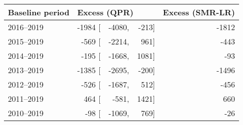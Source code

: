 \begin{tabular}{lrrrr} 
\hline
Baseline period & \multicolumn{3}{l}{Excess (QPR)} & Excess (SMR-LR) \\ 
\hline
2016--2019    &    -1984 [ & -4080, & -213]   &   -1812 \\ 
2015--2019    &    -569 [ & -2214, & 961]   &   -443 \\ 
2014--2019    &    -195 [ & -1668, & 1081]   &   -93 \\ 
2013--2019    &    -1385 [ & -2695, & -200]   &   -1496 \\ 
2012--2019    &    -526 [ & -1687, & 512]   &   -456 \\ 
2011--2019    &    464 [ & -581, & 1421]   &   660 \\ 
2010--2019    &    -98 [ & -1069, & 769]   &   -26 \\ 
\hline
\end{tabular}

